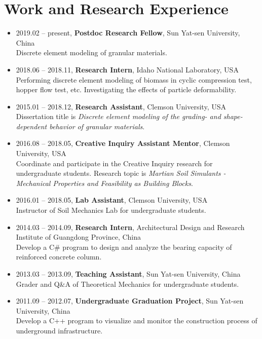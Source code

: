\documentclass[11pt,]{elsarticle}
\providecommand{\tightlist}{%
  \setlength{\itemsep}{0pt}\setlength{\parskip}{0pt}}
\begin{document}
\hypertarget{work-and-research-experience}{%
\section{Work and Research
Experience}\label{work-and-research-experience}}

\begin{itemize}
\tightlist
\item
  2019.02 -- present, \textbf{Postdoc Research Fellow}, Sun Yat-sen
  University, China\\
  Discrete element modeling of granular materials.
\item
  2018.06 -- 2018.11, \textbf{Research Intern}, Idaho National
  Laboratory, USA\\
  Performing discrete element modeling of biomass in cyclic compression
  test, hopper flow test, etc. Investigating the effects of particle
  deformability.
\item
  2015.01 -- 2018.12, \textbf{Research Assistant}, Clemson University,
  USA\\
  Dissertation title is \emph{Discrete element modeling of the grading-
  and shape- dependent behavior of granular materials}.
\item
  2016.08 -- 2018.05, \textbf{Creative Inquiry Assistant Mentor},
  Clemson University, USA\\
  Coordinate and participate in the Creative Inquiry research for
  undergraduate students. Research topic is \emph{Martian Soil Simulants
  - Mechanical Properties and Feasibility as Building Blocks}.
\item
  2016.01 -- 2018.05, \textbf{Lab Assistant}, Clemson University, USA\\
  Instructor of Soil Mechanics Lab for undergraduate students.
\item
  2014.03 -- 2014.09, \textbf{Research Intern}, Architectural Design and
  Research Institute of Guangdong Province, China\\
  Develop a C\# program to design and analyze the bearing capacity of
  reinforced concrete column.
\item
  2013.03 -- 2013.09, \textbf{Teaching Assistant}, Sun Yat-sen
  University, China\\
  Grader and Q\&A of Theoretical Mechanics for undergraduate students.
\item
  2011.09 -- 2012.07, \textbf{Undergraduate Graduation Project}, Sun
  Yat-sen University, China\\
  Develop a C++ program to visualize and monitor the construction
  process of underground infrastructure.
\end{itemize}
\end{document}

